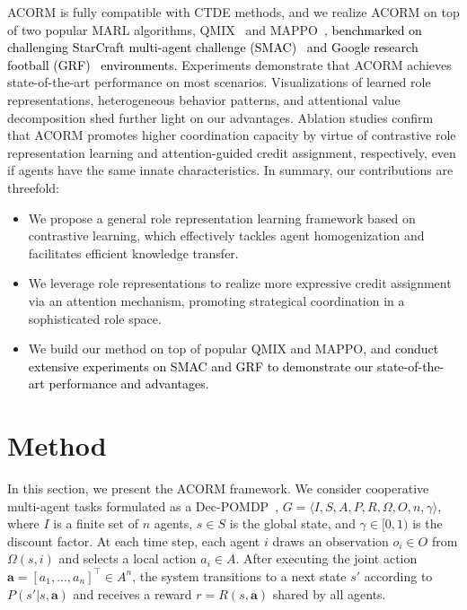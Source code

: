 \documentclass{article} %
\begin{document}
ACORM is fully compatible with CTDE methods, and we realize ACORM on top of two popular MARL algorithms, QMIX~\citep{rashid2020monotonic} and MAPPO~\citep{yu2022surprising}, \textcolor{black}{benchmarked on challenging StarCraft multi-agent challenge (SMAC)~\citep{samvelyan2019starcraft} and Google research football (GRF)~\citep{kurach2020google} environments.}
Experiments demonstrate that ACORM achieves state-of-the-art performance on most scenarios. 
Visualizations of learned role representations, heterogeneous behavior patterns, and attentional value decomposition shed further light on our advantages.
Ablation studies confirm that ACORM promotes higher coordination capacity by virtue of contrastive role representation learning and attention-guided credit assignment, respectively, even if agents have the same innate characteristics.
In summary, our contributions are threefold:
\begin{itemize}[itemsep=0em, leftmargin=1.5em]
\vspace{-0.5em}
    \item We propose a general role representation learning framework based on contrastive learning, which effectively tackles agent homogenization and facilitates efficient knowledge transfer.

    \item We leverage role representations to realize more expressive credit assignment via an attention mechanism, promoting strategical coordination in a sophisticated role space.

    \item We build our method on top of popular QMIX and MAPPO, and \textcolor{black}{conduct extensive experiments on SMAC and GRF to demonstrate our state-of-the-art performance and advantages.}
\end{itemize}





\section{Method}
In this section, we present the ACORM framework.
We consider cooperative multi-agent tasks formulated as a Dec-POMDP~\citep{oliehoek2016concise}, $G=\langle I, S, A, P, R, \Omega, O, n, \gamma \rangle$, where $I$ is a finite set of $n$ agents, $s\in S$ is the global state, and $\gamma\in [0,1)$ is the discount factor.
At each time step, each agent $i$ draws an observation $o_i\in O$ from $\Omega(s,i)$ and selects a local action $a_i\in A$.
After executing the joint action $\bm{a}=[a_1,...,a_n]^\top\in A^n$, the system transitions to a next state $s'$ according to $P(s'|s,\bm{a})$ and receives a reward $r=R(s,\bm{a})$ shared by all agents. 
\end{document}
